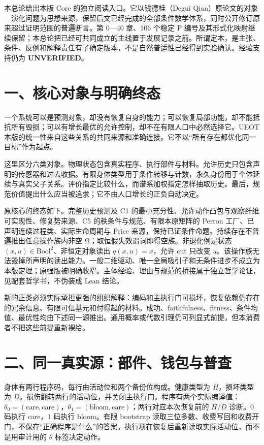 \documentclass[
  11pt,
  oneside]{book}
\begin{document}
本总论给出本版 Core 的独立阅读入口。它以钱德桂（Degui Qian）原论文的对象---演化问题为思想来源，保留后文已经完成的全部条件数学体系，同时公开修订原来超过证明范围的普遍断言。第 0---40 章、106 个稳定 P 编号及其形式化映射继续保留；本总论把已经可共同成立的主线置于发展记录之前。所谓定本，是主张、条件、反例和解释责任有了确定版本，不是自然普适性已经得到实验确认。经验支持仍为 \textbf{UNVERIFIED}。

\section{一、核心对象与明确终态}\label{ux4e00ux6838ux5fc3ux5bf9ux8c61ux4e0eux660eux786eux7ec8ux6001}

一个系统可以是预测对象，却没有恢复自身的能力；可以恢复局部功能，却不能抵抗所有毁损；可以有增长最优的允许控制，却不在有限人口中必然选择它。UEOT 本版的统一性来自这些关系的共同来源和准确连接。它不以``所有存在都优化同一目标''作为起点。

这里区分六类对象。物理状态包含真实程序、执行部件与材料。允许历史只包含声明的传感器和过去收据。有限身体类型用于条件转移与计数，永久身份用于个体延续与真实父子关系。评价指定比较什么，而谱系加权指定怎样抽取历史。最后，规范价值提出什么应当被追求；它不由人口增长的正负自动决定。

原核心的终态如下。完整历史预测及 C1 的最小充分性、允许动作凸包与观察纤维可实现性、修复势来源、C5 的秩条件与规范、有限本原矩阵的 Perron 工厂、已声明连续过程类、实际生命周期与 Price 来源，保持已证条件命题。持续存在不普遍推出任意操作族内非空 Ω；取恒假失效谓词即得空族。非退化例是状态 \((x,u)\in\mathrm{Bool}^2\)、非恒定对象读出 \(q(x,u)=x\)，允许 cut 只改变 \(u\)。该操作族无法毁掉所声明的读出能力。一般二维驱动、唯一全局吸引子和无条件进步不成立为本版定理；原强版被明确收窄。主体经验、理由与规范的桥接属于独立哲学论证，见配套哲学书，不伪装成 Lean 结论。

新的正类必须实际承担更强的组织解释：编码和主执行门可损坏，恢复依赖仍存在的冗余信息、有限可信基元和付得起的材料。成功、faithfulness、fitness、条件均值、最优性均由下述同一源推出。通用概率或代数引理仍可列显式前提，但本消费者不把这些前提重新裸给。

\section{二、同一真实源：部件、钱包与普查}\label{ux4e8cux540cux4e00ux771fux5b9eux6e90ux90e8ux4ef6ux94b1ux5305ux4e0eux666eux67e5}

身体有两行程序码，每行由活动位和两个备份位构成。健康类型为 \(H\)，损坏类型为 \(D\)。损伤翻转两行的活动位，并关闭主执行门。程序有两个实际编译值：\(\theta_0=(\mathrm{care},\mathrm{care})\)，\(\theta_1=(\mathrm{bloom},\mathrm{care})\)；两行对应本次恢复前的 \(H/D\) 诊断。\(0\) 码执行 care，\(1\) 码执行 bloom。有限 bootstrap 读取三位多数、收费写回和收费开门，不保存``正确程序是什么''的答案。执行项在恢复后重新读取实际活动位，而不是用审计用的 \(\theta\) 标签决定动作。
\end{document}
